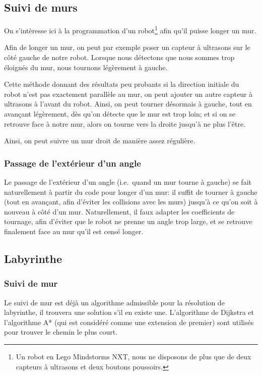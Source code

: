 \subsection{Suivi de murs}
  On s'intèresse ici à la programmation d'un robot\footnote{Un robot en Lego
  Mindstorms NXT, nous ne disposons de plus que de deux capteurs à ultrasons et
  deux boutons poussoirs.} afin qu'il puisse longer un mur.

  Afin de longer un mur, on peut par exemple poser un capteur à ultrasons sur
  le côté gauche de notre robot. Lorsque nous détectons que nous sommes trop
  éloignés du mur, nous tournons légèrement à gauche.

  Cette méthode donnant des résultats peu probants si la direction initiale du
  robot n'est pas exactement parallèle au mur, on peut ajouter un autre capteur
  à ultrasons à l'avant du robot. Ainsi, on peut tourner désormais à gauche,
  tout en avançant légèrement, dès qu'on détecte que le mur est trop loin; et
  si on se retrouve face à notre mur, alors on tourne vers la droite jusqu'à ne
  plus l'être.

  Ainsi, on peut suivre un mur droit de manière assez régulière.

  \subsubsection{Passage de l'extérieur d'un angle}
    Le passage de l'extérieur d'un angle (i.e.\ quand un mur tourne à gauche)
    se fait naturellement à partir du code pour longer d'un mur: il suffit de
    tourner à gauche (tout en avançant, afin d'éviter les collisions avec les
    murs) jusqu'à ce qu'on soit à nouveau à côté d'un mur. Naturellement, il
    faux adapter les coefficients de tournage, afin d'éviter que le robot ne
    prenne un angle trop large, et se retrouve finalement face au mur qu'il est
    censé longer.

\subsection{Labyrinthe}\label{sec:laby}
  \subsubsection{Suivi de mur}
    Le suivi de mur est déjà un algorithme admissible pour la résolution de
    labyrinthe, il trouvera une solution s'il en existe une. L'algorithme de
    Dijkstra et l'algorithme A* (qui est considéré comme une extension de
    premier) sont utilisés pour trouver le chemin le plus court.

